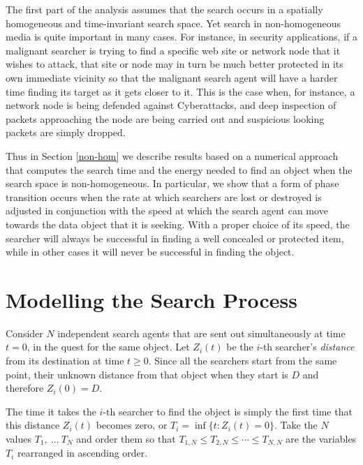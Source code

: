 \documentclass[journal]{IEEEtran}
\begin{document}
The first part of the analysis assumes that the search occurs in a spatially homogeneous and time-invariant
search space. Yet search in non-homogeneous media is quite important in many cases.
For instance, in security applications, if a malignant searcher is trying to find a specific web site or network node that it wishes to attack, that site or node may
in turn be much better protected in its own immediate vicinity so that the malignant search agent will have a harder time finding its target as it gets closer to it.
This is the case when, for instance, a network node is being defended against Cyberattacks, and
deep inspection of packets approaching the node are being carried out and suspicious looking packets are simply dropped.

Thus  in Section \ref{non-hom} we describe results based on a numerical approach that computes the search time and the energy needed to find an object when the search space is non-homogeneous. In particular,
we show that a form of phase transition occurs when the
rate at which searchers are lost or destroyed is adjusted in conjunction with the speed at which the
search agent can move towards the data object that it is seeking. With a proper choice of its speed, the searcher will always be successful in finding a well concealed or protected item,
while in other cases it will never be successful in finding the object.

\section{Modelling the Search Process}\label{model}




Consider $N$ independent search agents that are sent out simultaneously at time $t=0$, in the quest for the same object. Let $Z_i(t)$ be the $i$-th searcher's {\em distance} from its destination at time $t\geq 0$. Since all the searchers start from the same point, their unknown distance from that object when they start is $D$ and therefore  $Z_i(0)=D$.

The time it takes the $i$-th searcher to  find the object is simply the first time that this distance $Z_i(t)$ becomes zero, or $T_i = \inf\{t: Z_i(t)=0 \}$. Take the $N$ values $T_1,~...~T_N$ and order them so that $T_{1,N}\leq T_{2,N}\leq \cdots \leq T_{N,N}$ are  the variables $T_i$ rearranged in ascending order.
\end{document}
